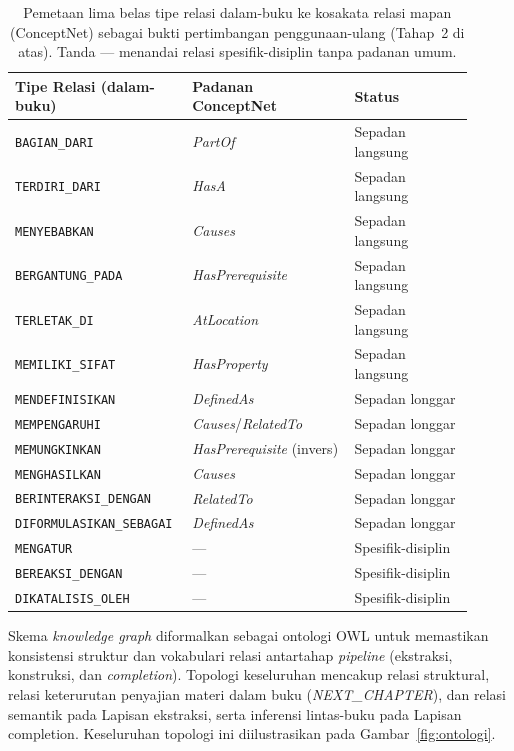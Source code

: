 \documentclass[../../thesis]{subfiles}
\begin{document}
\begin{table}[htbp]
\centering
\caption{Pemetaan lima belas tipe relasi dalam-buku ke kosakata relasi mapan
  (ConceptNet) sebagai bukti pertimbangan penggunaan-ulang (Tahap~2 di atas).
  Tanda --- menandai relasi spesifik-disiplin tanpa padanan umum.}
\label{tab:pemetaan-relasi}
\begin{tabular}{@{}p{0.32\linewidth}p{0.34\linewidth}p{0.25\linewidth}@{}}
  \toprule
  \textbf{Tipe Relasi (dalam-buku)} & \textbf{Padanan ConceptNet} & \textbf{Status} \\
  \midrule
  \texttt{BAGIAN\_DARI}     & \textit{PartOf}          & Sepadan langsung \\
  \texttt{TERDIRI\_DARI}    & \textit{HasA}            & Sepadan langsung \\
  \texttt{MENYEBABKAN}      & \textit{Causes}          & Sepadan langsung \\
  \texttt{BERGANTUNG\_PADA} & \textit{HasPrerequisite} & Sepadan langsung \\
  \texttt{TERLETAK\_DI}     & \textit{AtLocation}      & Sepadan langsung \\
  \texttt{MEMILIKI\_SIFAT}  & \textit{HasProperty}     & Sepadan langsung \\
  \midrule
  \texttt{MENDEFINISIKAN}          & \textit{DefinedAs}                 & Sepadan longgar \\
  \texttt{MEMPENGARUHI}            & \textit{Causes}/\textit{RelatedTo} & Sepadan longgar \\
  \texttt{MEMUNGKINKAN}            & \textit{HasPrerequisite} (invers)  & Sepadan longgar \\
  \texttt{MENGHASILKAN}            & \textit{Causes}                    & Sepadan longgar \\
  \texttt{BERINTERAKSI\_DENGAN}    & \textit{RelatedTo}                 & Sepadan longgar \\
  \texttt{DIFORMULASIKAN\_SEBAGAI} & \textit{DefinedAs}                 & Sepadan longgar \\
  \midrule
  \texttt{MENGATUR}          & ---  & Spesifik-disiplin \\
  \texttt{BEREAKSI\_DENGAN}  & ---  & Spesifik-disiplin \\
  \texttt{DIKATALISIS\_OLEH} & ---  & Spesifik-disiplin \\
  \bottomrule
\end{tabular}
\end{table}

Skema \textit{knowledge graph} diformalkan sebagai ontologi OWL untuk
memastikan konsistensi struktur dan vokabulari relasi antartahap
\textit{pipeline} (ekstraksi, konstruksi, dan \textit{completion}).
Topologi keseluruhan mencakup relasi struktural, relasi keterurutan
penyajian materi dalam buku (\textit{NEXT\_CHAPTER}), dan relasi semantik
pada Lapisan ekstraksi, serta inferensi lintas-buku pada Lapisan completion.
Keseluruhan topologi ini diilustrasikan pada Gambar~\ref{fig:ontologi}.
\end{document}
